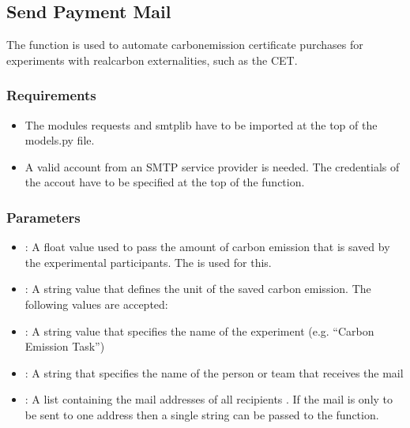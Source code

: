 \documentclass[letterpaper,10pt,english]{sphinxmanual}
\begin{document}
\subsection{Send Payment Mail}
\label{\detokenize{Subsession_fields:send-payment-mail}}
The  function is used to automate carbon\sphinxhyphen{}emission certificate purchases for experiments with real\sphinxhyphen{}carbon externalities, such as the CET.


\subsubsection{Requirements}
\label{\detokenize{Subsession_fields:requirements}}\begin{itemize}
\item {} 
The modules requests and smtplib have to be imported at the top of the models.py file.

\item {} 
A valid account from an SMTP service provider is needed. The credentials of the accout have to be specified at
the top of the function.

\end{itemize}


\subsubsection{Parameters}
\label{\detokenize{Subsession_fields:parameters}}\begin{itemize}
\item {} 
: A float value used to pass the amount of carbon emission that is saved by the experimental participants. The {\hyperref[\detokenize{Subsession_fields:sum-saved-emission-ref}]{}} is used for this.

\item {} 
: A string value that defines the unit of the saved carbon emission. The following values are accepted: \sphinxcode{\sphinxupquote{{[}"mg", "g", "kg", "t", "oz", "lbs", "st"{]}}}

\item {} 
: A string value that specifies the name of the experiment (e.g. “Carbon Emission Task”)

\item {} 
: A string that specifies the name of the person or team that receives the mail

\item {} 
: A list containing the mail addresses of all recipients . If the mail is only to be sent to one address then a single string can be passed to the function.

\end{itemize}
\end{document}
